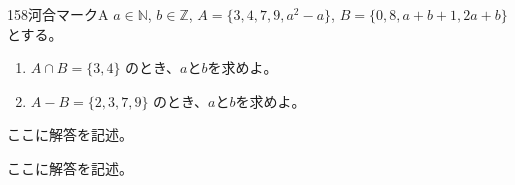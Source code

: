 \begin{prob}{158}{}{河合マークA}
 $a\in\mathbb{N}$, $b\in\mathbb{Z}$, $A=\{3, 4, 7, 9, a^2-a\}$, $B=\{0, 8, a+b+1, 2a+b\}$ とする。
 \begin{enumerate}
  \item $A\cap B = \{3, 4\}$ のとき、$a$と$b$を求めよ。
  \item $A-B = \{2, 3, 7, 9\}$ のとき、$a$と$b$を求めよ。
 \end{enumerate}
\end{prob}
ここに解答を記述。

ここに解答を記述。